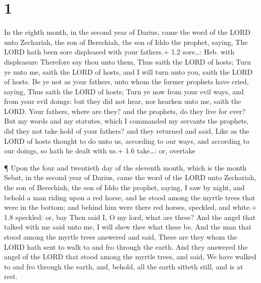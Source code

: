 \hypertarget{section}{%
\section{1}\label{section}}

 In the eighth month, in the second year of Darius, came the
word of the LORD unto Zechariah, the son of Berechiah, the son of Iddo
the prophet, saying,  The LORD hath been sore displeased
with your fathers.+ 1.2 sore\ldots: Heb. with displeasure 
Therefore say thou unto them, Thus saith the LORD of hosts; Turn ye unto
me, saith the LORD of hosts, and I will turn unto you, saith the LORD of
hosts.  Be ye not as your fathers, unto whom the former
prophets have cried, saying, Thus saith the LORD of hosts; Turn ye now
from your evil ways, and from your evil doings: but they did not hear,
nor hearken unto me, saith the LORD.  Your fathers, where
are they? and the prophets, do they live for ever?  But my
words and my statutes, which I commanded my servants the prophets, did
they not take hold of your fathers? and they returned and said, Like as
the LORD of hosts thought to do unto us, according to our ways, and
according to our doings, so hath he dealt with us.+ 1.6 take\ldots: or,
overtake

 ¶ Upon the four and twentieth day of the eleventh month,
which is the month Sebat, in the second year of Darius, came the word of
the LORD unto Zechariah, the son of Berechiah, the son of Iddo the
prophet, saying,  I saw by night, and behold a man riding
upon a red horse, and he stood among the myrtle trees that were in the
bottom; and behind him were there red horses, speckled, and white.+ 1.8
speckled: or, bay  Then said I, O my lord, what are these?
And the angel that talked with me said unto me, I will shew thee what
these be.  And the man that stood among the myrtle trees
answered and said, These are they whom the LORD hath sent to walk to and
fro through the earth.  And they answered the angel of the
LORD that stood among the myrtle trees, and said, We have walked to and
fro through the earth, and, behold, all the earth sitteth still, and is
at rest.

